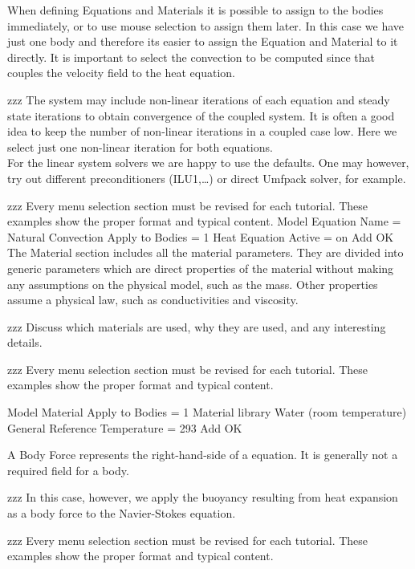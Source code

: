 When defining Equations and Materials it is possible to assign to the bodies immediately, or to use mouse selection to assign them later. In this case we have just one body and therefore its easier to assign the Equation and Material to it directly.  It is important to select the convection to be computed since that couples the velocity field to the heat equation.

zzz The system may include non-linear iterations of each equation and steady state iterations to obtain convergence of the coupled system. It is often a good idea to keep the number of non-linear iterations in a coupled case low. Here we select just one non-linear iteration for both equations.\\

For the linear system solvers we are happy to use the defaults. One may however, try out different preconditioners (ILU1,\ldots) or direct Umfpack solver, for example.

zzz Every menu selection section must be revised for each tutorial.  These examples show the proper format and typical content.
\ttbegin
Model
  Equation
   Name = Natural Convection
    Apply to Bodies = 1
    Heat Equation
      Active = on
    Add 
    OK
\ttend        
The Material section includes all the material parameters. They are divided into generic parameters which are direct properties of the material without making any assumptions on the physical model, such as the mass. Other properties assume a physical law, such as conductivities and viscosity. 

zzz Discuss which materials are used, why they are used, and any interesting details.
   
zzz Every menu selection section must be revised for each tutorial.  These examples show the proper format and typical content.

\ttbegin
Model
  Material
    Apply to Bodies = 1 
    Material library    
      Water (room temperature)
    General 
      Reference Temperature = 293
    Add
    OK
\ttend

A Body Force represents the right-hand-side of a equation. It is generally not a required field for a body. 

zzz In this case, however, we apply the buoyancy resulting from heat expansion as a body force to the Navier-Stokes equation.

zzz Every menu selection section must be revised for each tutorial.  These examples show the proper format and typical content.

